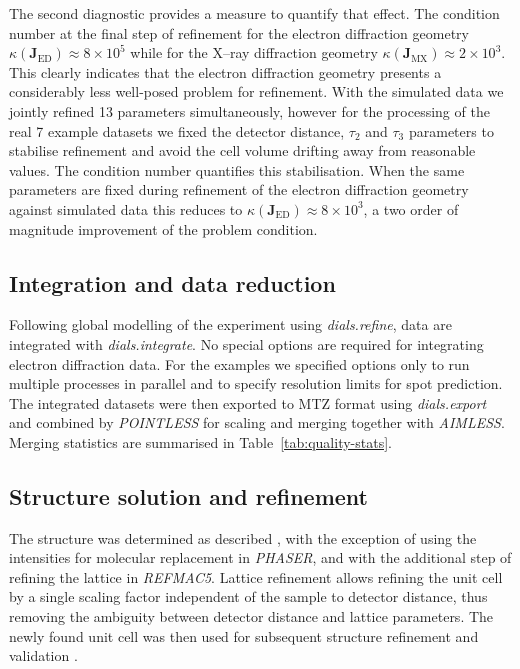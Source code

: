 \documentclass[preprint]{iucr}
\newcommand{\dialsrefine}{\emph{dials.refine}\xspace}
\newcommand{\dialsintegrate}{\emph{dials.integrate}\xspace}
\newcommand{\dialsexport}{\emph{dials.export}\xspace}
\newcommand{\pointless}{\emph{POINTLESS}\xspace}
\newcommand{\aimless}{\emph{AIMLESS}\xspace}
\newcommand{\refmac}{\emph{REFMAC5}\xspace}
\newcommand{\phaser}{\emph{PHASER}\xspace}
\newcommand{\mat}[1]{\mathbf{#1}}
\begin{document}
The second diagnostic provides a measure to quantify that effect. The condition
number at the final step of refinement for the electron diffraction geometry
$\kappa \left( \mat{J}_{\textrm{ED}} \right) \approx 8 \times 10^5$ while for
the X--ray diffraction geometry $\kappa \left( \mat{J}_{\textrm{MX}} \right)
\approx 2 \times 10^3$. This clearly indicates that the electron diffraction
geometry presents a considerably less well-posed problem for refinement. With
the simulated data we jointly refined 13 parameters simultaneously, however for
the processing of the real 7 example datasets we fixed the detector distance,
$\tau_2$ and $\tau_3$ parameters to stabilise refinement and avoid the cell
volume drifting away from reasonable values. The condition number quantifies
this stabilisation. When the same parameters are fixed during refinement of the
electron diffraction geometry against simulated data this reduces to $\kappa
\left( \mat{J}_{\textrm{ED}} \right) \approx 8 \times 10^3$, a two order of
magnitude improvement of the problem condition.

\subsection{Integration and data reduction}

Following global modelling of the experiment using \dialsrefine, data are
integrated with \dialsintegrate. No special options are required for integrating
electron diffraction data. For the examples we specified options only to
run multiple processes in parallel and to specify resolution limits for spot
prediction. The integrated datasets were then exported to MTZ format using
\dialsexport and combined by \pointless \cite{Evans2006} for scaling and merging
together with \aimless \cite{Evans2013}. Merging statistics are summarised in
Table~\ref{tab:quality-stats}.

\subsection{Structure solution and refinement \label{sec:phase-refine}}

The structure was determined as described \cite{Clabbers2017}, with the exception of
using the intensities for molecular replacement in \phaser \cite{McCoy2007,Read2016},
and with the additional step of refining the lattice in \refmac \cite{Murshudov2011}.
Lattice refinement allows refining the unit cell by a single scaling factor independent
of the sample to detector distance, thus removing the ambiguity between detector
distance and lattice parameters. The newly found unit cell was then used for subsequent
structure refinement and validation \cite{Murshudov2011,Joosten2014,Luebben2015}.
\end{document}
